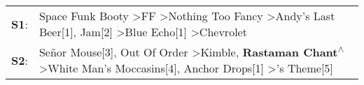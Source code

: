 \begin{supertabular}{p{0.03\textwidth}p{0.92\textwidth}}
 \textbf{S1}:  &            Space Funk Booty\textsuperscript{} \textgreater \enspace FF\textsuperscript{} \textgreater \enspace Nothing Too Fancy\textsuperscript{} \textgreater \enspace Andy's Last Beer[1]\textsuperscript{}, \enspace Jam[2]\textsuperscript{} \textgreater \enspace Blue Echo[1]\textsuperscript{} \textgreater \enspace Chevrolet\textsuperscript{}  \enspace  \\
 \textbf{S2}:  &  Señor Mouse[3]\textsuperscript{}, \enspace Out Of Order\textsuperscript{} \textgreater \enspace Kimble\textsuperscript{}, \enspace \textbf{Rastaman Chant\textsuperscript{$\wedge$}} \textgreater \enspace White Man's Moccasins[4]\textsuperscript{}, \enspace Anchor Drops[1]\textsuperscript{} \textgreater {}'s Theme[5]\textsuperscript{}  \enspace  \\
\end{supertabular}
